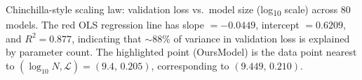 \caption{Chinchilla-style scaling law: validation loss vs.\ model size (log\textsubscript{10} scale) across 80 models. The red OLS regression line has slope $= -0.0449$, intercept $= 0.6209$, and $R^2 = 0.877$, indicating that $\sim\!88\%$ of variance in validation loss is explained by parameter count. The highlighted point (OursModel) is the data point nearest to $(\log_{10}N, \mathcal{L}) = (9.4,\,0.205)$, corresponding to $(9.449,\,0.210)$.}

